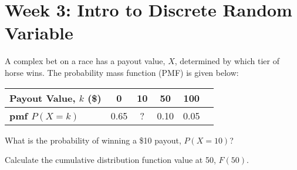 \documentclass[a4paper, 10pt]{article}
\begin{document}
\subject[2110205 - Statistics for Computer Engineering]


\section{Week 3: Intro to Discrete Random Variable}



\begin{problem}
A complex bet on a race has a payout value, \( X \), determined by which tier
of horse wins. The probability mass function (PMF) is given below:
\par\noindent
\begin{table}[h]
    \centering
    \renewcommand{\arraystretch}{1.5}
    \begin{tabular}{|l|c|c|c|c|c|}
        \hline
        \textbf{Payout Value, \( k \) (\$)} & 0 & 10 & 50 & 100 \\ 
        \hline
        \textbf{pmf \( P(X = k) \)} & 0.65 & ? & 0.10 & 0.05 \\
        \hline
    \end{tabular}
    \label{tab:hw03-pb01}
\end{table}

\begin{subproblems}
    \item What is the probability of winning a \$10 payout, \( P(X = 10) \)?
    \item  Calculate the cumulative distribution function value at 50, \( F(50) \).
\end{subproblems}
\end{problem}
\end{document}
